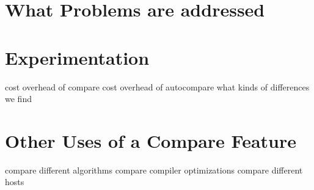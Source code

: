 \documentclass{llncs}
\begin{document}
\section {What Problems are addressed}


\section{Experimentation}
   cost overhead of compare
   cost overhead of autocompare
   what kinds of differences we find

\section{Other Uses of a Compare Feature}
   compare different algorithms
   compare compiler optimizations
   compare different hosts



\end{document}
